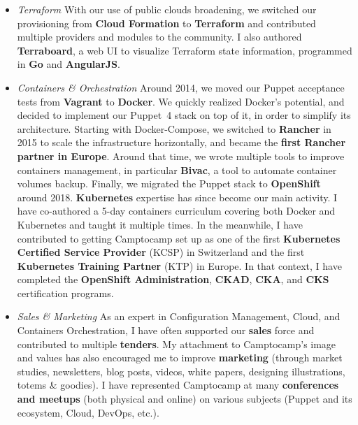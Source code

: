 \documentclass[11pt,a4paper,nolmodern]{moderncv}
\begin{document}
{\begin{itemize}
    \item \emph{Terraform}\newline
      With our use of public clouds broadening, we switched our provisioning from \textbf{Cloud Formation} to \textbf{Terraform} and contributed multiple providers and modules to the community.
      I also authored \textbf{Terraboard}, a web UI to visualize Terraform state information, programmed in \textbf{Go} and \textbf{AngularJS}.
    \item \emph{Containers \& Orchestration}\newline
      Around 2014, we moved our Puppet acceptance tests from \textbf{Vagrant} to \textbf{Docker}.
      We quickly realized Docker's potential, and decided to implement our Puppet 4 stack on top of it, in order to simplify its architecture.
      Starting with Docker-Compose, we switched to \textbf{Rancher} in 2015 to scale the infrastructure horizontally, and became the \textbf{first Rancher partner in Europe}.
      Around that time, we wrote multiple tools to improve containers management, in particular \textbf{Bivac}, a tool to automate container volumes backup.
      Finally, we migrated the Puppet stack to \textbf{OpenShift} around 2018. \newline
      \textbf{Kubernetes} expertise has since become our main activity. I have co-authored a 5-day containers curriculum covering both Docker and Kubernetes and taught it multiple times.
      In the meanwhile, I have contributed to getting Camptocamp set up as one of the first \textbf{Kubernetes Certified Service Provider} (KCSP) in Switzerland and the first \textbf{Kubernetes Training Partner} (KTP) in Europe.\newline
      In that context, I have completed the \textbf{OpenShift Administration}, \textbf{CKAD}, \textbf{CKA}, and \textbf{CKS} certification programs.
    \item \emph{Sales \& Marketing}\newline
      As an expert in Configuration Management, Cloud, and Containers Orchestration, I have often 
      supported our \textbf{sales} force and contributed to multiple \textbf{tenders}.
      My attachment to Camptocamp's image and values has also encouraged me to improve \textbf{marketing} (through market studies, newsletters, blog posts, videos, white papers, designing illustrations, totems \& goodies).
      I have represented Camptocamp at many \textbf{conferences and meetups} (both physical and online) on various subjects (Puppet and its ecosystem, Cloud, DevOps, etc.).
  \end{itemize}
}
\end{document}
